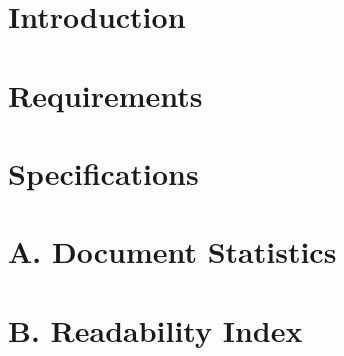 \documentclass[12pt,a4paper]{report}
\begin{document}

\tableofcontents
\pagestyle{fancy}
\chapter{Introduction}




\listoftables
{}
\listoffigures
{}

\pagebreak






\pagebreak



\chapter{Requirements}











\chapter{Specifications}



\printnoidxglossaries
\chapter[Document Statistics]{A. Document Statistics}

\chapter[Readability Index]{B. Readability Index}

\printindex
\end{document}
